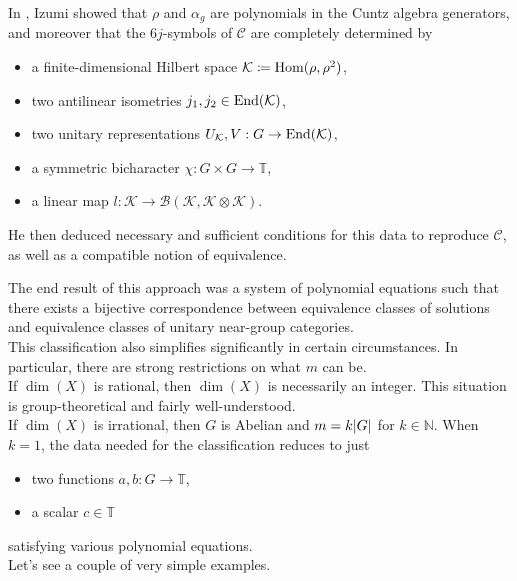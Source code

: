 \documentclass{beamer}
\DeclarePairedDelimiter{\abs}{\lvert}{\rvert}
\begin{document}
\begin{frame}
In \cite{Izu17}, Izumi showed that $\rho$ and $\alpha_g$ are \textcolor{structure}{polynomials in the Cuntz algebra generators}, and moreover that the \textcolor{structure}{$6j$-symbols} of $\mathcal{C}$ are completely determined by\\[1.5ex]
\begin{itemize}
\item a finite-dimensional Hilbert space $\mathcal{K} \coloneqq \textup{Hom}(\rho, \rho^2)$,\\[2ex]
\item two antilinear isometries $j_1, j_2 \in \textup{End}(\mathcal{K})$,\\[2ex]
\item two unitary representations $U_\mathcal{K}, V : G \to \textup{End}(\mathcal{K})$,\\[2ex]
\item a symmetric bicharacter $\chi : G \times G \to \mathbb{T}$,\\[2ex]
\item a linear map $l : \mathcal{K} \to \mathcal{B}(\mathcal{K}, \mathcal{K} \otimes \mathcal{K})$.\\[2ex]
\end{itemize}
He then deduced necessary and sufficient conditions for this data to reproduce $\mathcal{C}$, as well as a compatible notion of equivalence.
\end{frame}

\begin{frame}
The end result of this approach was a system of polynomial equations such that there exists a \textcolor{structure}{bijective correspondence} between equivalence classes of solutions and equivalence classes of unitary near-group categories.\\[2ex]

This classification also simplifies significantly in certain circumstances. In particular, there are strong restrictions on what $m$ can be.\pause\\[2ex]

If \textcolor{structure}{$\dim(X)$ is rational}, then $\dim(X)$ is necessarily an integer. This situation is group-theoretical and fairly well-understood.\pause\\[2ex]

If \textcolor{structure}{$\dim(X)$ is irrational}, then $G$ is Abelian and $m = k\abs{G}$ for $k \in \mathbb{N}$. When $k = 1$, the data needed for the classification reduces to just\\[0.5ex]
\begin{itemize}
\item two functions $a, b : G \to \mathbb{T}$,\\[1ex]
\item a scalar $c \in \mathbb{T}$\\[1ex]
\end{itemize}
satisfying various polynomial equations.\pause\\[2ex]

Let's see a couple of very simple examples.
\end{frame}
\end{document}
